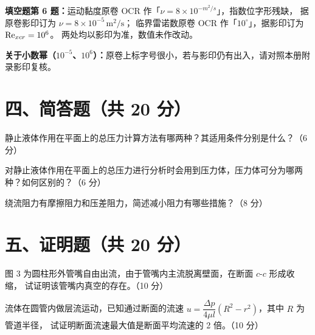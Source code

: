 \begin{tishi}
\textbf{填空题第 6 题：}运动黏度原卷 OCR 作「$\nu=8\times10^{-m^2/s}$」，指数位字形残缺，
据原卷影印订为 $\nu=8\times10^{-5}\,\mathrm{m^2/s}$；
临界雷诺数原卷 OCR 作「$10^{\circ}$」，据影印订为 $\mathrm{Re}_{xcr}=10^{6}$。
两处均以影印为准，数值未作改动。

\textbf{关于小数幂（$10^{-5}$、$10^{6}$）：}原卷上标字号很小，若与影印仍有出入，请对照本册附录影印复核。
\end{tishi}

\section{四、简答题（共 20 分）}

\begin{ti}
  \item 静止液体作用在平面上的总压力计算方法有哪两种？其适用条件分别是什么？（6 分）
  \hfill{}

  \item 对静止液体作用在平面上的总压力进行分析时会用到压力体，压力体可分为哪两种？如何区别的？（6 分）
  \hfill{}

  \item 绕流阻力有摩擦阻力和压差阻力，简述减小阻力有哪些措施？（8 分）
  \hfill{}
\end{ti}

\section{五、证明题（共 20 分）}

\begin{ti}
  \item 图 3 为圆柱形外管嘴自由出流，由于管嘴内主流脱离壁面，在断面 $c$-$c$ 形成收缩，
  试证明该管嘴内真空的存在。（10 分）\hfill{}

  \item 流体在圆管内做层流运动，已知通过断面的流速
  $u=\dfrac{\Delta p}{4\mu l}\left(R^{2}-r^{2}\right)$，其中 $R$ 为管道半径，
  试证明断面流速最大值是断面平均流速的 2 倍。（10 分）\hfill{}
\end{ti}

